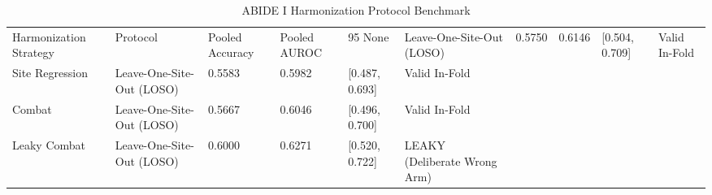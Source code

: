 \begin{table}
\caption{ABIDE I Harmonization Protocol Benchmark}
\label{tab:harmonization}
\begin{tabular}{llllll}
\toprule
Harmonization Strategy & Protocol & Pooled Accuracy & Pooled AUROC & 95%
\midrule
None & Leave-One-Site-Out (LOSO) & 0.5750 & 0.6146 & [0.504, 0.709] & Valid In-Fold \\
Site Regression & Leave-One-Site-Out (LOSO) & 0.5583 & 0.5982 & [0.487, 0.693] & Valid In-Fold \\
Combat & Leave-One-Site-Out (LOSO) & 0.5667 & 0.6046 & [0.496, 0.700] & Valid In-Fold \\
Leaky Combat & Leave-One-Site-Out (LOSO) & 0.6000 & 0.6271 & [0.520, 0.722] & LEAKY (Deliberate Wrong Arm) \\
\bottomrule
\end{tabular}
\end{table}
